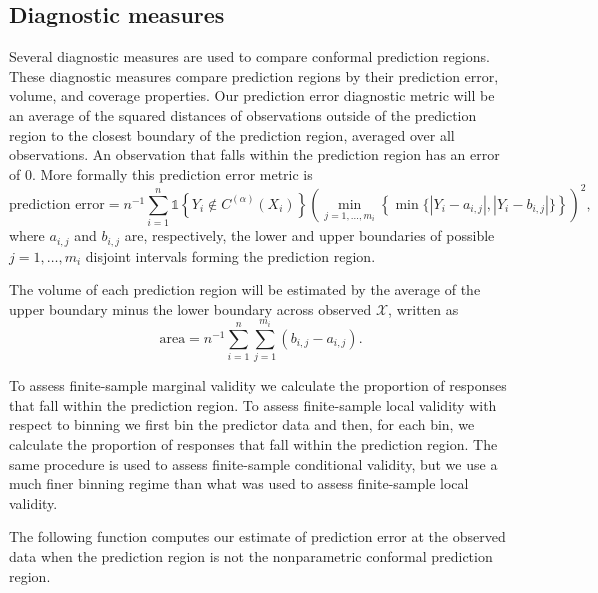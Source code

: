 \documentclass[11pt]{article}\usepackage[]{graphicx}\usepackage[]{color}
\newcommand{\Copt}{C^{(\alpha)}}
\newcommand{\X}{\mathcal{X}}
\newcommand{\indicator}[1]{\mathds{1}\left\{ #1 \right\}}
\begin{document}
\subsection{Diagnostic measures}

Several diagnostic measures are used to compare conformal prediction regions.
These diagnostic measures compare prediction regions by their 
prediction error, volume, and coverage properties.
Our prediction error diagnostic metric will be an average of the squared 
distances of observations outside of the prediction region to the closest 
boundary of the prediction region, averaged over all 
observations. An observation that falls within the prediction region 
has an error of 0.  More formally this prediction error metric is 
$$
  \text{prediction error} 
    = n^{-1}\sum_{i=1}^n\indicator{Y_i \not\in \Copt(X_i)}
      \left(\min_{j=1,\ldots,m_i}\left\{\min\{|Y_i - a_{i,j}|, 
        |Y_i - b_{i,j}|\}\right\}\right)^2,
$$
where $a_{i,j}$ and $b_{i,j}$ are, respectively, the lower and upper 
boundaries of possible $j = 1, \ldots, m_i$ disjoint intervals forming 
the prediction region.  

The volume of each prediction region will be estimated by the average of the 
upper boundary minus the lower boundary across observed $\X$, written as
$$ 
  \text{area} = n^{-1}\sum_{i=1}^n\sum_{j=1}^{m_i}(b_{i,j} - a_{i,j}).
$$


To assess finite-sample marginal validity we calculate the proportion of 
responses that fall within the prediction region.  To assess finite-sample 
local validity with respect to binning we first bin the predictor data and 
then, for each bin, we calculate the proportion of responses that fall 
within the prediction region. The same procedure is used to assess 
finite-sample conditional validity, but we use a much finer binning regime 
than what was used to assess finite-sample local validity.  

The following function computes our estimate of prediction error at the 
observed data when the prediction region is not the nonparametric 
conformal prediction region.
\end{document}
